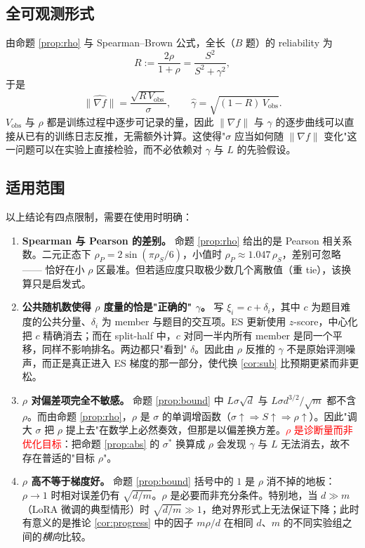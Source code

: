 \documentclass[UTF8]{ctexart}
\begin{document}
\subsection{全可观测形式}

由命题 \ref{prop:rho} 与 Spearman--Brown 公式，全长（$B$ 题）的 reliability 为
\[
R := \frac{2\rho}{1+\rho} = \frac{S^2}{S^2+\gamma^2},
\]
于是
\[
\boxed{
\widehat{\|\nabla f\|} = \frac{\sqrt{R\,V_{\mathrm{obs}}}}{\sigma},
\qquad
\widehat\gamma = \sqrt{(1-R)\,V_{\mathrm{obs}}} .
}
\]
$V_{\mathrm{obs}}$ 与 $\rho$ 都是训练过程中逐步可记录的量，因此 $\|\nabla f\|$ 与 $\gamma$ 的逐步曲线可以直接从已有的训练日志反推，无需额外计算。这使得"$\sigma$ 应当如何随 $\|\nabla f\|$ 变化"这一问题可以在实验上直接检验，而不必依赖对 $\gamma$ 与 $L$ 的先验假设。

\subsection{适用范围}

以上结论有四点限制，需要在使用时明确：

\begin{enumerate}
\item \textbf{Spearman 与 Pearson 的差别。} 命题 \ref{prop:rho} 给出的是 Pearson 相关系数。二元正态下 $\rho_P = 2\sin(\pi\rho_S/6)$，小值时 $\rho_P\approx 1.047\,\rho_S$，差别可忽略 —— 恰好在小 $\rho$ 区最准。但若适应度只取极少数几个离散值（重 tie），该换算只是启发式。

\item \textbf{公共随机数使得 $\rho$ 度量的恰是"正确的" $\gamma$。} 写 $\xi_i = c + \delta_i$，其中 $c$ 为题目难度的公共分量、$\delta_i$ 为 member 与题目的交互项。ES 更新使用 $z$-score，中心化把 $c$ 精确消去；而在 split-half 中，$c$ 对同一半内所有 member 是同一个平移，同样不影响排名。两边都只"看到" $\delta$。因此由 $\rho$ 反推的 $\gamma$ 不是原始评测噪声，而正是真正进入 ES 梯度的那一部分，使代换 \ref{cor:sub} 比预期更紧而非更松。

\item \textbf{$\rho$ 对偏差项完全不敏感。} 命题 \ref{prop:bound} 中 $L\sigma\sqrt d$ 与 $L\sigma d^{3/2}/\sqrt m$ 都不含 $\rho$。而由命题 \ref{prop:rho}，$\rho$ 是 $\sigma$ 的单调增函数（$\sigma\uparrow\Rightarrow S\uparrow\Rightarrow\rho\uparrow$）。因此"调大 $\sigma$ 把 $\rho$ 提上去"在数学上必然奏效，但那是以偏差换方差。\textcolor{red}{$\rho$ 是诊断量而非优化目标}：把命题 \ref{prop:abs} 的 $\sigma^*$ 换算成 $\rho$ 会发现 $\gamma$ 与 $L$ 无法消去，故不存在普适的"目标 $\rho$"。

\item \textbf{$\rho$ 高不等于梯度好。} 命题 \ref{prop:bound} 括号中的 $1$ 是 $\rho$ 消不掉的地板：$\rho\to1$ 时相对误差仍有 $\sqrt{d/m}$。$\rho$ 是必要而非充分条件。特别地，当 $d\gg m$（LoRA 微调的典型情形）时 $\sqrt{d/m}\gg 1$，绝对界形式上无法保证下降；此时有意义的是推论 \ref{cor:progress} 中的因子 $m\rho/d$ 在相同 $d$、$m$ 的不同实验组之间的\emph{横向}比较。
\end{enumerate}
\end{document}
